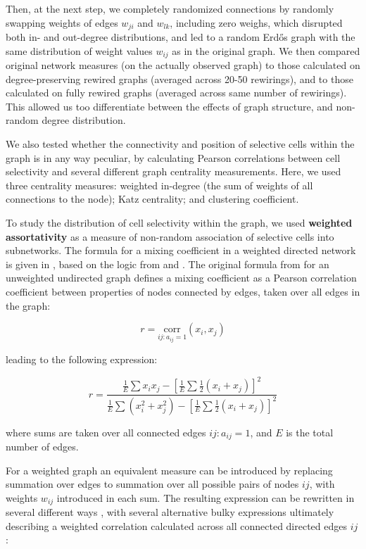 \documentclass{article}
\begin{document}
Then, at the next step, we completely randomized connections by randomly swapping weights of edges $w_{ji}$ and $w_{lk}$, including zero weighs, which disrupted both in- and out-degree distributions, and led to a random Erd\H{o}s graph with the same distribution of weight values $w_{ij}$ as in the original graph. We then compared original network measures (on the actually observed graph) to those calculated on degree-preserving rewired graphs (averaged across 20-50 rewirings), and to those calculated on fully rewired graphs (averaged across same number of rewirings). This allowed us too differentiate between the effects of graph structure, and non-random degree distribution.

We also tested whether the connectivity and position of selective cells within the graph is in any way peculiar, by calculating Pearson correlations between cell selectivity and several different graph centrality measurements. Here, we used three centrality measures: weighted in-degree (the sum of weights of all connections to the node); Katz centrality; and clustering coefficient.

To study the distribution of cell selectivity within the graph, we used \textbf{weighted assortativity} as a measure of non-random association of selective cells into subnetworks. The formula for a mixing coefficient in a weighted directed network is given in \citep{farine2014weighted}, based on the logic from \citep{newman2003mixing} and \citep{leung2007weighted}. The original formula from \citep{newman2003mixing} for an unweighted undirected graph defines a mixing coefficient as a Pearson correlation coefficient between properties of nodes connected by edges, taken over all edges in the graph:

$$r=\underset{ij: a_{ij}=1}{\text{corr}}(x_i,x_j)$$

leading to the following expression:

$$r = \frac{\frac{1}{E} \sum{x_i x_j} - [\frac{1}{E} \sum{\frac{1}{2}(x_i+x_j)}]^2} {\frac{1}{E} \sum{(x_i^2+x_j^2)}-[\frac{1}{E} \sum{\frac{1}{2}(x_i+x_j)}]^2}$$

where sums are taken over all connected edges $ij: a_{ij}=1$, and $E$ is the total number of edges.

For a weighted graph an equivalent measure can be introduced by replacing summation over edges to summation over all possible pairs of nodes $ij$, with weights $w_{ij}$ introduced in each sum. The resulting expression can be rewritten in several different ways \citep{newman2003mixing,leung2007weighted,farine2014weighted,teller2014assortative}, with several alternative bulky expressions ultimately describing a weighted correlation calculated across all connected directed edges $ij$:
\end{document}
